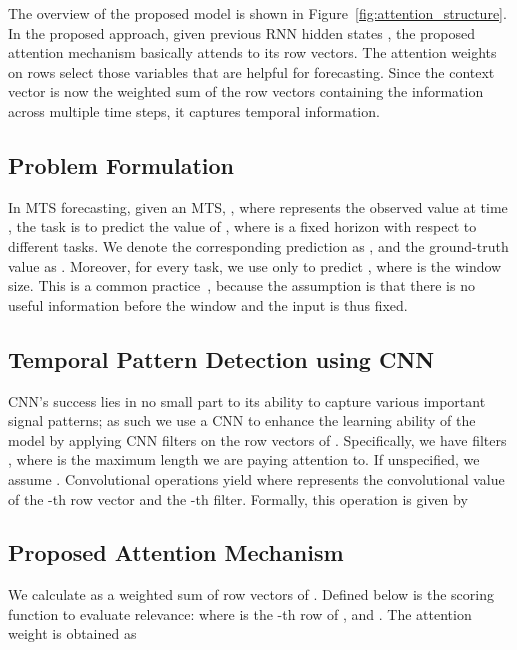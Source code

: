 The overview of the proposed model is shown in Figure~\ref{fig:attention_structure}.
In the proposed approach, given previous RNN hidden states , the proposed attention mechanism basically attends to its row vectors.
The attention weights on rows select those variables that are helpful for forecasting. 
Since the context vector  is now the weighted sum of the row vectors containing the information across multiple time steps, it captures temporal information.

\subsection{Problem Formulation} \label{subsec:problem_formulation}

In MTS forecasting, given an MTS, , where  represents the observed value at time , the task is to predict the value of , where  is a fixed horizon with respect to different tasks.
We denote the corresponding prediction as , and the ground-truth value as .
Moreover, for every task, we use only  to predict , where  is the window size.
This is a common practice~\cite{LSTNet,DA-RNN}, because the assumption is that there is no useful information before the window and the input is thus fixed.

\subsection{Temporal Pattern Detection using CNN}

CNN's success lies in no small part to its ability to capture various important signal patterns; as such we use a CNN to enhance the learning ability of the model by applying CNN filters on the row vectors of .
Specifically, we have  filters , where  is the maximum length we are paying attention to.
If unspecified, we assume .
Convolutional operations yield  where  represents the convolutional value of the -th row vector and the -th filter.
Formally, this operation is given by



\subsection{Proposed Attention Mechanism}\label{ssec:proposed_attention}

We calculate  as a weighted sum of row vectors of . 
Defined below is the scoring function  to evaluate relevance:
where  is the -th row of , and .
The attention weight  is obtained as

